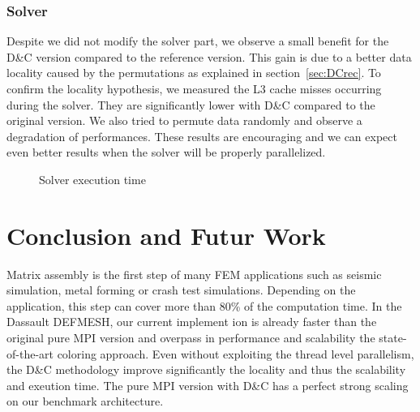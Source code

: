 \documentclass{IOS-Book-Article}
\begin{document}
\subsubsection{Solver}
Despite we did not modify the solver part, we observe a small benefit for the D\&C version compared to the reference version.
This gain is due to a better data locality caused by the permutations as explained in section~\ref{sec:DCrec}.
To confirm the locality hypothesis, we measured the L3 cache misses occurring during the solver. They are significantly lower with D\&C compared to the original version.
We also tried to permute data randomly and observe a degradation of performances.
These results are encouraging and we can expect even better results when the solver will be properly parallelized.
\begin{figure}[htp]
 \centering
 \caption{Solver execution time}
 \label{fig:solCurves}
\end{figure}

\section{Conclusion and Futur Work}
Matrix assembly is the first step of many FEM applications such as seismic simulation, metal forming or crash test simulations.
Depending on the application, this step can cover more than 80\% of the computation time.
In the Dassault DEFMESH, our current implement ion is already faster than the original pure MPI version and overpass in performance and scalability the state-of-the-art coloring approach.
Even without exploiting the thread level parallelism, the D\&C methodology improve significantly the locality and thus the scalability and exeution time.
The pure MPI version with D\&C has a perfect strong scaling on our benchmark architecture.
\end{document}
